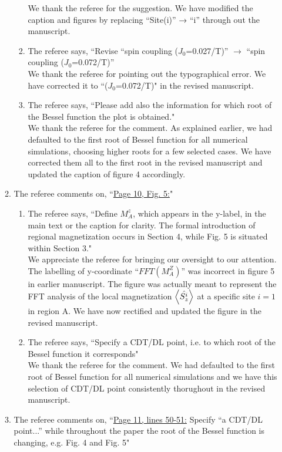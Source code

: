 \documentclass[aps,prb,reprint,showpacs,floatfix,superscriptaddress, onecolumn, nofootinbib, 10pt]{revtex4-2}
\newcommand{\response}[1]{{\color{black}#1}} %
\newcommand{\comment}[1]{{\color{blue}#1}} %
\begin{document}
\begin{enumerate}
\begin{enumerate}
\begin{enumerate}
			\response{We thank the referee for the suggestion. We have modified the caption and figures by replacing ``Site(i)” → ``i” through out the manuscript.}
			\item The referee says, \comment{``Revise “spin coupling ($J_0$=0.027/T)” $\rightarrow$ “spin coupling ($J_0$=0.072/T)”}\\
			
			\response{We thank the referee for pointing out the typographical error. We have corrected it to ``($J_0$=0.072/T)" in the revised manuscript.}\\
			\item The referee says, \comment{``Please add also the information for which root of the Bessel function the plot is obtained."}\\
			
			\response{We thank the referee for the comment. As explained earlier, we had defaulted to the first root of Bessel function for all numerical simulations, choosing higher roots for a few selected cases. We have corrected them all to the first root in the revised manuscript and updated the caption of figure 4 accordingly.}\\
		\end{enumerate}
		\item The referee comments on, \comment{``\underline{Page 10, Fig. 5:}"}
		\begin{enumerate}
			\item The referee says, \comment{``Define $M_A^z$, which appears in the y-label, in the main text or the caption for
			clarity. The formal introduction of regional magnetization occurs in Section 4, while Fig. 5 is situated within Section 3."}\\
			\response{We appreciate the referee for bringing our oversight to our attention. The labelling of y-coordinate ``$FFT(M^Z_A)$'' was incorrect in figure 5 in earlier manuscript. The figure was actually meant to represent the FFT analysis of the local magnetization $\expval{\hat{S_z^i}}$ at a specific site $i=1$ in region A. We have now rectified and updated the figure in the revised manuscript.}\\
			
			\item The referee says, \comment{``Specify a CDT/DL point, i.e. to which root of the Bessel function it corresponds"}\\
			
			\response{We thank the referee for the comment. We had defaulted to the first root of Bessel function for all numerical simulations and we have this selection of CDT/DL point consistently thorughout in the revised manuscript.}\\
		\end{enumerate}
		\item The referee comments on, \comment{``\underline{Page 11, lines 50-51:} Specify “a CDT/DL point...” while throughout the paper the root of the Bessel function is changing, e.g. Fig. 4 and Fig. 5"}\\
		

\end{enumerate}
\end{enumerate}
\end{document}
